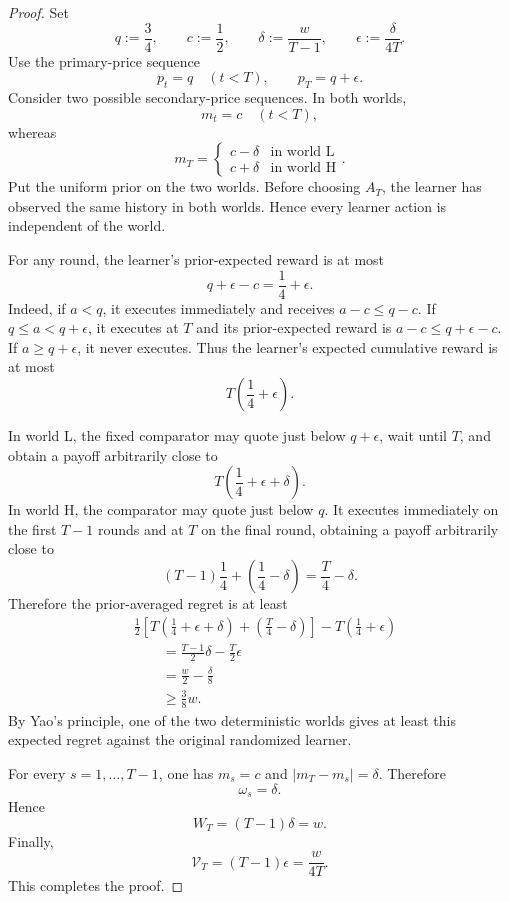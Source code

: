 \documentclass[11pt]{article}
\theoremstyle{definition}
\begin{document}
\begin{proof}
Set
\[
    q:=\frac{3}{4},
    \qquad
    c:=\frac{1}{2},
    \qquad
    \delta:=\frac{w}{T-1},
    \qquad
    \epsilon:=\frac{\delta}{4T}.
\]
Use the primary-price sequence
\[
    p_t=q \quad (t<T),
    \qquad
    p_T=q+\epsilon.
\]
Consider two possible secondary-price sequences. In both worlds,
\[
    m_t=c \quad (t<T),
\]
whereas
\[
    m_T=
    \begin{cases}
        c-\delta & \text{in world L}\\
        c+\delta & \text{in world H}
    \end{cases}.
\]
Put the uniform prior on the two worlds. Before choosing $A_T$, the
learner has observed the same history in both worlds. Hence every
learner action is independent of the world.

For any round, the learner's prior-expected reward is at most
\[
    q+\epsilon-c=\frac{1}{4}+\epsilon.
\]
Indeed, if $a<q$, it executes immediately and receives
$a-c\le q-c$. If $q\le a<q+\epsilon$, it executes at $T$ and its
prior-expected reward is $a-c\le q+\epsilon-c$. If
$a\ge q+\epsilon$, it never executes. Thus the learner's expected
cumulative reward is at most
\[
    T\left(\frac{1}{4}+\epsilon\right).
\]

In world L, the fixed comparator may quote just below $q+\epsilon$,
wait until $T$, and obtain a payoff arbitrarily close to
\[
    T\left(\frac{1}{4}+\epsilon+\delta\right).
\]
In world H, the comparator may quote just below $q$. It executes
immediately on the first $T-1$ rounds and at $T$ on the final round,
obtaining a payoff arbitrarily close to
\[
    (T-1)\frac{1}{4}
    +\left(\frac{1}{4}-\delta\right)
    =\frac{T}{4}-\delta.
\]
Therefore the prior-averaged regret is at least
\begin{align*}
    &\frac{1}{2}
    \left[
        T\left(\frac{1}{4}+\epsilon+\delta\right)
        +\left(\frac{T}{4}-\delta\right)
    \right]
    -T\left(\frac{1}{4}+\epsilon\right)\\
    &\qquad=\frac{T-1}{2}\delta-\frac{T}{2}\epsilon\\
    &\qquad=\frac{w}{2}-\frac{\delta}{8}\\
    &\qquad\ge\frac{3}{8}w.
\end{align*}
By Yao's principle, one of the two deterministic worlds gives at least
this expected regret against the original randomized learner.

For every $s=1,\ldots,T-1$, one has $m_s=c$ and
$|m_T-m_s|=\delta$. Therefore
\[
    \omega_s=\delta.
\]
Hence
\[
    W_T=(T-1)\delta=w.
\]
Finally,
\[
    \mathcal{V}_T=(T-1)\epsilon=\frac{w}{4T}.
\]
This completes the proof.
\end{proof}
\end{document}
